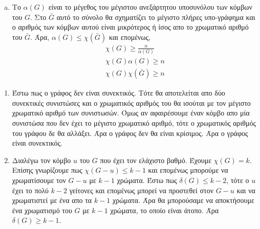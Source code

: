 \documentclass{assignment}
\begin{document}
\solution

\begin{enumerate}[(a)]

\item

Το $\alpha(G)$ είναι το μέγεθος του μέγιστου ανεξάρτητου υποσυνόλου των κόμβων του $G$. Στο $\bar G$ αυτό το σύνολο θα σχηματίζει το μέγιστο
πλήρες υπο-γράφημα και ο αριθμός των κόμβων αυτού είναι μικρότερος ή ίσος απο το χρωματικό αριθμό του $\bar G$.
Άρα, $\alpha(G) \le \chi(\bar G)$ και επομένως,
\begin{gather*}
\chi(G) \ge \frac{n}{\alpha(G)} \\
\chi(G) \alpha(G) \ge n \\
\chi(G) \chi(\bar G) \ge n
\end{gather*}

\end{enumerate}

\begin{enumerate}[({b}.i)]
\item 
Έστω πως ο γράφος δεν είναι συνεκτικός. Τότε θα αποτελείται απο δύο συνεκτικές συνιστώσες και ο χρωματικός αριθμός του θα ισούται 
με τον μέγιστο χρωματικό αριθμό των συνιστωσών. Όμως αν αφαιρέσουμε έναν κόμβο απο μία συνιστώσα που δεν έχει το μέγιστο
χρωματικό αριθμό, τότε ο χρωματικός αριθμός του γράφου δε θα αλλάξει. Άρα ο γράφος δεν θα είναι κρίσιμος. Άρα ο γράφος είναι συνεκτικός.

\item
Διαλέγω τον κόμβο $u$ του $G$ που έχει τον ελάχιστο βαθμό. Έχουμε $\chi(G) = k$. Επίσης γνωρίζουμε πως 
$\chi(G-u) \le k-1$ και επομένως μπορούμε να χρωματίσουμε τον $G-u$ με $k-1$ χρώματα. 
Έστω πως $\delta(G) \le k-2$, τότε ο $u$ έχει το πολύ $k-2$ γείτονες και επομένως μπορεί να προστεθεί 
στον $G-u$ και να χρωματιστεί με ένα απο τα $k-1$ χρώματα. Άρα θα μπορούσαμε να αποκτήσουμε ένα χρωματισμό του $G$ με $k-1$ 
χρώματα, το οποίο είναι άτοπο. Άρα $\delta(G) \ge k-1$.

\end{enumerate}
\end{document}
